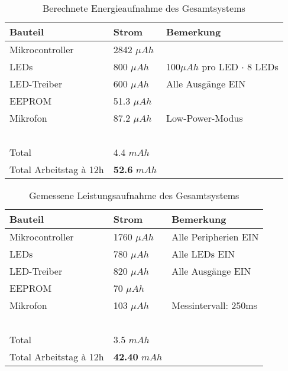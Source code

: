 ﻿	\begin{table}[H] 
	\centering
	\begin{tabular}{|l|l|l|}
		\hline
		\textbf{Bauteil} & \textbf{Strom} & \textbf{Bemerkung} \\ \hline
		Mikrocontroller & 2842 $\mu Ah$ & ~ \\ \hline
		LEDs & 800 $\mu Ah$ & 100$\mu Ah$ pro LED $\cdot$ 8 LEDs \\ \hline
		LED-Treiber & 600 $\mu Ah$ & Alle Ausgänge EIN \\ \hline
		EEPROM & 51.3 $\mu Ah$ & ~ \\ \hline
		Mikrofon & 87.2 $\mu Ah$ & Low-Power-Modus \\ \hline
		~ & ~ & ~ \\ \hline
		Total & 4.4 $mAh$ & ~ \\ \hline
		Total Arbeitstag à 12h & \textbf{52.6} $mAh$ & ~ \\ \hline
	\end{tabular}
	\caption{Berechnete Energieaufnahme des Gesamtsystems}
	\label{tab:leistung-berechnet}
\end{table}
		\begin{table}[H] 
			\centering
			\begin{tabular}{|l|l|l|}
			\hline
			\textbf{Bauteil} & \textbf{Strom} & \textbf{Bemerkung} \\ \hline
			Mikrocontroller & 1760 $\mu Ah$ & Alle Peripherien EIN \\ \hline
			LEDs & 780 $\mu Ah$ & Alle LEDs EIN\\ \hline
			LED-Treiber & 820 $\mu Ah$ & Alle Ausgänge EIN \\ \hline
			EEPROM & 70 $\mu Ah$ & ~ \\ \hline
			Mikrofon & 103 $\mu Ah$ & Messintervall: 250ms \\ \hline
			~ & ~ & ~ \\ \hline
			Total & 3.5 $mAh$ & ~ \\ \hline
			Total Arbeitstag à 12h & \textbf{42.40} $mAh$ & ~ \\ \hline
		\end{tabular}
		\caption{Gemessene Leistungsaufnahme des Gesamtsystems}
		\label{tab:leistung-gemessen}
		\end{table}